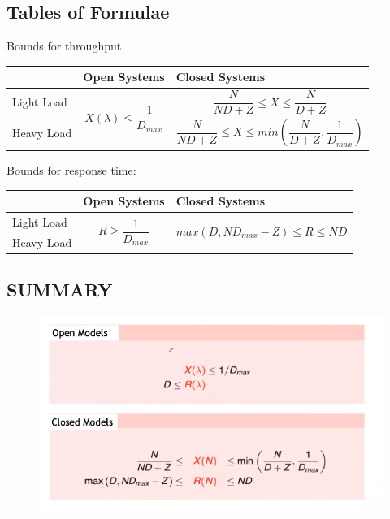 \documentclass{article}
\begin{document}
			\subsection{Tables of Formulae}
				Bounds for throughput
				\begin{longtable}{ m{} | m{0.45\textwidth} | m{} |}
					& Open Systems & Closed Systems \\
					\hline
					Light Load & \multirow{2}{0.3\textwidth}{ 
						\begin{equation}
							X(\lambda) \leq \frac{1}{D_{max}}
						\end{equation}
					} &  
						\begin{equation}
							\frac{N}{ND + Z} \leq X \leq \frac{N}{D + Z}
						\end{equation}
					\\
					Heavy Load & & 
						\begin{equation}
							\frac{N}{ND + Z} \leq X \leq min(\frac{N}{D + Z}, \frac{1}{D_{max}})
						\end{equation}
					\\
					\hline					
				\end{longtable}
				Bounds for response time:
				\begin{longtable}{ m{} | m{} | m{} |}
					& Open Systems & Closed Systems \\
					\hline
					Light Load & \multirow{2}{0.3\textwidth}{ 
						\begin{equation}
							R \geq \frac{1}{D_{max}}
						\end{equation}
					} & \multirow{2}{0.3\textwidth}{
						\begin{equation}
							max(D, ND_{max}-Z) \leq R \leq ND
						\end{equation}
					}
					\\
					Heavy Load & & \\
					\hline					
				\end{longtable}

			\subsection{SUMMARY}	
				\begin{figure}[H]
					\centering
					\includegraphics[width = \textwidth]{./images/superSummary2.png}
				\end{figure}
				
\end{document}
